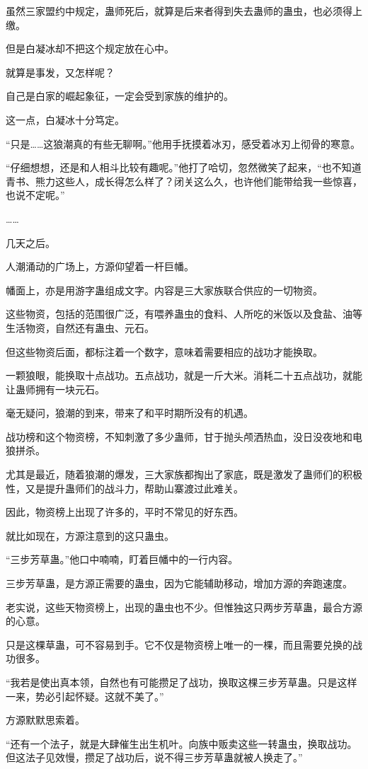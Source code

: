 \begin{this_body}
虽然三家盟约中规定，蛊师死后，就算是后来者得到失去蛊师的蛊虫，也必须得上缴。

但是白凝冰却不把这个规定放在心中。

就算是事发，又怎样呢？

自己是白家的崛起象征，一定会受到家族的维护的。

这一点，白凝冰十分笃定。

“只是……这狼潮真的有些无聊啊。”他用手抚摸着冰刃，感受着冰刃上彻骨的寒意。

“仔细想想，还是和人相斗比较有趣呢。”他打了哈切，忽然微笑了起来，“也不知道青书、熊力这些人，成长得怎么样了？闭关这么久，也许他们能带给我一些惊喜，也说不定呢。”

……

几天之后。

人潮涌动的广场上，方源仰望着一杆巨幡。

幡面上，亦是用游字蛊组成文字。内容是三大家族联合供应的一切物资。

这些物资，包括的范围很广泛，有喂养蛊虫的食料、人所吃的米饭以及食盐、油等生活物资，自然还有蛊虫、元石。

但这些物资后面，都标注着一个数字，意味着需要相应的战功才能换取。

一颗狼眼，能换取十点战功。五点战功，就是一斤大米。消耗二十五点战功，就能让蛊师拥有一块元石。

毫无疑问，狼潮的到来，带来了和平时期所没有的机遇。

战功榜和这个物资榜，不知刺激了多少蛊师，甘于抛头颅洒热血，没日没夜地和电狼拼杀。

尤其是最近，随着狼潮的爆发，三大家族都掏出了家底，既是激发了蛊师们的积极性，又是提升蛊师们的战斗力，帮助山寨渡过此难关。

因此，物资榜上出现了许多的，平时不常见的好东西。

就比如现在，方源注意到的这只蛊虫。

“三步芳草蛊。”他口中喃喃，盯着巨幡中的一行内容。

三步芳草蛊，是方源正需要的蛊虫，因为它能辅助移动，增加方源的奔跑速度。

老实说，这些天物资榜上，出现的蛊虫也不少。但惟独这只两步芳草蛊，最合方源的心意。

只是这棵草蛊，可不容易到手。它不仅是物资榜上唯一的一棵，而且需要兑换的战功很多。

“我若是使出真本领，自然也有可能攒足了战功，换取这棵三步芳草蛊。只是这样一来，势必引起怀疑。这就不美了。”

方源默默思索着。

“还有一个法子，就是大肆催生出生机叶。向族中贩卖这些一转蛊虫，换取战功。但这法子见效慢，攒足了战功后，说不得三步芳草蛊就被人换走了。”


\end{this_body}
